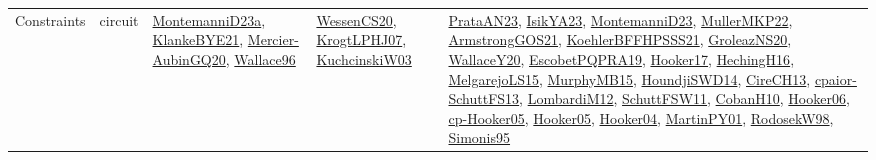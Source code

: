 {\begin{longtable}{llp{6cm}p{6cm}p{6cm}}
Constraints & circuit & \href{articles/MontemanniD23a.pdf}{MontemanniD23a}\cite{MontemanniD23a}, \href{papers/KlankeBYE21.pdf}{KlankeBYE21}\cite{KlankeBYE21}, \href{papers/Mercier-AubinGQ20.pdf}{Mercier-AubinGQ20}\cite{Mercier-AubinGQ20}, \href{articles/Wallace96.pdf}{Wallace96}\cite{Wallace96} & \href{papers/WessenCS20.pdf}{WessenCS20}\cite{WessenCS20}, \href{papers/KrogtLPHJ07.pdf}{KrogtLPHJ07}\cite{KrogtLPHJ07}, \href{articles/KuchcinskiW03.pdf}{KuchcinskiW03}\cite{KuchcinskiW03} & \href{articles/PrataAN23.pdf}{PrataAN23}\cite{PrataAN23}, \href{articles/IsikYA23.pdf}{IsikYA23}\cite{IsikYA23}, \href{articles/MontemanniD23.pdf}{MontemanniD23}\cite{MontemanniD23}, \href{articles/MullerMKP22.pdf}{MullerMKP22}\cite{MullerMKP22}, \href{papers/ArmstrongGOS21.pdf}{ArmstrongGOS21}\cite{ArmstrongGOS21}, \href{articles/KoehlerBFFHPSSS21.pdf}{KoehlerBFFHPSSS21}\cite{KoehlerBFFHPSSS21}, \href{papers/GroleazNS20.pdf}{GroleazNS20}\cite{GroleazNS20}, \href{articles/WallaceY20.pdf}{WallaceY20}\cite{WallaceY20}, \href{articles/EscobetPQPRA19.pdf}{EscobetPQPRA19}\cite{EscobetPQPRA19}, \href{papers/Hooker17.pdf}{Hooker17}\cite{Hooker17}, \href{papers/HechingH16.pdf}{HechingH16}\cite{HechingH16}, \href{papers/MelgarejoLS15.pdf}{MelgarejoLS15}\cite{MelgarejoLS15}, \href{papers/MurphyMB15.pdf}{MurphyMB15}\cite{MurphyMB15}, \href{papers/HoundjiSWD14.pdf}{HoundjiSWD14}\cite{HoundjiSWD14}, \href{papers/CireCH13.pdf}{CireCH13}\cite{CireCH13}, \href{papers/cpaior-SchuttFS13.pdf}{cpaior-SchuttFS13}\cite{cpaior-SchuttFS13}, \href{articles/LombardiM12.pdf}{LombardiM12}\cite{LombardiM12}, \href{articles/SchuttFSW11.pdf}{SchuttFSW11}\cite{SchuttFSW11}, \href{papers/CobanH10.pdf}{CobanH10}\cite{CobanH10}, \href{articles/Hooker06.pdf}{Hooker06}\cite{Hooker06}, \href{papers/cp-Hooker05.pdf}{cp-Hooker05}\cite{cp-Hooker05}, \href{articles/Hooker05.pdf}{Hooker05}\cite{Hooker05}, \href{papers/Hooker04.pdf}{Hooker04}\cite{Hooker04}, \href{articles/MartinPY01.pdf}{MartinPY01}\cite{MartinPY01}, \href{papers/RodosekW98.pdf}{RodosekW98}\cite{RodosekW98}, \href{papers/Simonis95.pdf}{Simonis95}\cite{Simonis95}\\

\end{longtable}}

